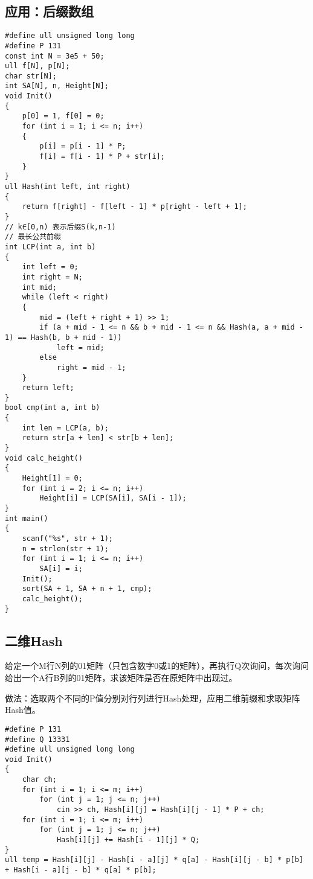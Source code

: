 \subsection{应用：后缀数组}

\begin{lstlisting}
#define ull unsigned long long
#define P 131
const int N = 3e5 + 50;
ull f[N], p[N];
char str[N];
int SA[N], n, Height[N];
void Init()
{
    p[0] = 1, f[0] = 0;
    for (int i = 1; i <= n; i++)
    {
        p[i] = p[i - 1] * P;
        f[i] = f[i - 1] * P + str[i];
    }
}
ull Hash(int left, int right)
{
    return f[right] - f[left - 1] * p[right - left + 1];
}
// k∈[0,n) 表示后缀S(k,n-1)
// 最长公共前缀
int LCP(int a, int b)
{
    int left = 0;
    int right = N;
    int mid;
    while (left < right)
    {
        mid = (left + right + 1) >> 1;
        if (a + mid - 1 <= n && b + mid - 1 <= n && Hash(a, a + mid - 1) == Hash(b, b + mid - 1))
            left = mid;
        else
            right = mid - 1;
    }
    return left;
}
bool cmp(int a, int b)
{
    int len = LCP(a, b);
    return str[a + len] < str[b + len];
}
void calc_height()
{
    Height[1] = 0;
    for (int i = 2; i <= n; i++)
        Height[i] = LCP(SA[i], SA[i - 1]);
}
int main()
{
    scanf("%s", str + 1);
    n = strlen(str + 1);
    for (int i = 1; i <= n; i++)
        SA[i] = i;
    Init();
    sort(SA + 1, SA + n + 1, cmp);
    calc_height();
}
\end{lstlisting}

\subsection{二维Hash}
给定一个M行N列的01矩阵（只包含数字0或1的矩阵），再执行Q次询问，每次询问给出一个A行B列的01矩阵，求该矩阵是否在原矩阵中出现过。

做法：选取两个不同的P值分别对行列进行Hash处理，应用二维前缀和求取矩阵Hash值。
\begin{lstlisting}
#define P 131
#define Q 13331
#define ull unsigned long long
void Init()
{
    char ch;
    for (int i = 1; i <= m; i++)
        for (int j = 1; j <= n; j++)
            cin >> ch, Hash[i][j] = Hash[i][j - 1] * P + ch;
    for (int i = 1; i <= m; i++)
        for (int j = 1; j <= n; j++)
            Hash[i][j] += Hash[i - 1][j] * Q;
}
ull temp = Hash[i][j] - Hash[i - a][j] * q[a] - Hash[i][j - b] * p[b] + Hash[i - a][j - b] * q[a] * p[b];
\end{lstlisting}